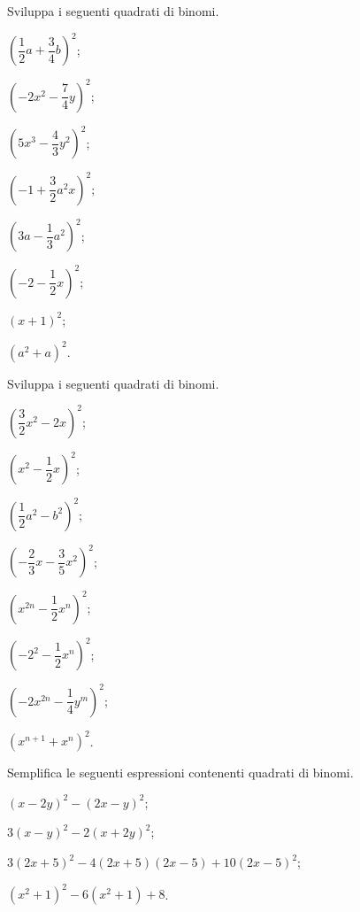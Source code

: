 \begin{esercizio}
 \label{ese:12.6}
Sviluppa i seguenti quadrati di binomi.
\begin{multicols}{4}
\begin{enumeratea}
 \item $\left(\dfrac{1}{2}a+\dfrac{3}{4}b\right)^{2}$;
 \item $\left(-2x^{2}-\dfrac{7}{4}y\right)^{2}$;
 \item $\left(5x^{3}-\dfrac{4}{3}y^{2}\right)^{2}$;
 \item $\left(-1+\dfrac{3}{2}a^{2}x\right)^{2}$;
 \item $\left(3a-\dfrac{1}{3}a^{2}\right)^{2}$;
 \item $\left(-2-\dfrac{1}{2}x\right)^{2}$;
 \item $\left(x+1\right)^{2}$;
 \item $\left(a^{2}+a\right)^{2}$.
\end{enumeratea}
\end{multicols}
\end{esercizio}

\begin{esercizio}
 \label{ese:12.7}
Sviluppa i seguenti quadrati di binomi.
\begin{multicols}{2}
\begin{enumeratea}
 \item $\left(\dfrac{3}{2}x^{2}-2x\right)^{2}$;
 \item $\left(x^{2}-\dfrac{1}{2}x\right)^{2}$;
 \item $\left(\dfrac{1}{2}a^{2}-b^{2}\right)^{2}$;
 \item $\left(-{\dfrac{2}{3}x-\dfrac{3}{5}x^{2}}\right)^{2}$;
 \item $\left(x^{2n}-\dfrac{1}{2}x^{n}\right)^{2}$;
 \item $\left(-2^{2}-\dfrac{1}{2}x^{n}\right)^{2}$;
 \item $\left(-2x^{2n}-\dfrac{1}{4}y^{m}\right)^{2}$;
 \item $\left(x^{n+1}+x^{n}\right)^{2}$.
\end{enumeratea}
\end{multicols}
\end{esercizio}

\begin{esercizio}[\Ast]
 \label{ese:12.8}
Semplifica le seguenti espressioni contenenti quadrati di binomi.

\begin{enumeratea}
 \item $\left(x-2y\right)^{2}-\left(2x-y\right)^{2}$;
 \item $3(x-y)^{2}-2(x+2y)^{2}$;
 \item $3(2x+5)^{2}-4(2x+5)(2x-5)+10(2x-5)^{2}$;
 \item $\left(x^{2}+1\right)^{2}-6\left(x^{2}+1\right)+8$.
\end{enumeratea}
\end{esercizio}



